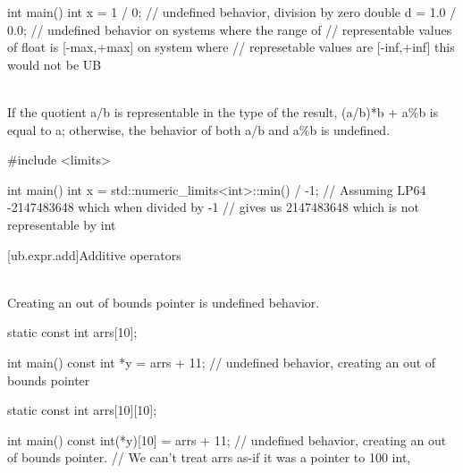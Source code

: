 \pnum
\begin{example}
\begin{codeblock}
int main() {
  int x = 1 / 0;        // undefined behavior, division by zero
  double d = 1.0 / 0.0; // undefined behavior on systems where the range of
                        // representable values of float is [-max,+max] on system where
                        // represetable values are [-inf,+inf] this would not be UB
}
\end{codeblock}
\end{example}

\pnum
{} \\
If the
quotient a/b is representable in the type of the result, (a/b)*b + a\%b is equal to a; otherwise, the behavior
of both a/b and a\%b is undefined.

\pnum
\begin{example}
\begin{codeblock}
#include <limits>

int main() {
  int x =
      std::numeric_limits<int>::min() / -1; // Assuming LP64 -2147483648 which when divided by -1
                                            // gives us 2147483648 which is not representable by int
}
\end{codeblock}
\end{example}

[ub.expr.add]{Additive operators}

\pnum
{} \\
Creating an out of bounds pointer is undefined behavior.

\pnum
\begin{example}
\begin{codeblock}
static const int arrs[10]{};

int main() {
  const int *y = arrs + 11;             // undefined behavior, creating an out of bounds pointer
}
\end{codeblock}
\end{example}

\begin{example}
\begin{codeblock}
static const int arrs[10][10]{};

int main() {
  const int(*y)[10] = arrs + 11;        // undefined behavior, creating an out of bounds pointer.
                                        // We can't treat arrs as-if it was a pointer to 100 int,
}
\end{codeblock}
\end{example}

